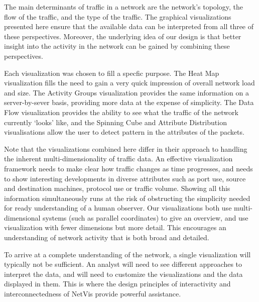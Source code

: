 The main determinants of traffic in a network are the network's topology, the flow of the traffic, and the type of the traffic. The graphical visualizations presented here ensure that the available data can be interpreted from all three of these perspectives. Moreover, the underlying idea of our design is that better insight into the activity in the network can be gained by combining these perspectives.

Each visualization was chosen to fill a specfic purpose.  The Heat Map visualization fills the need to gain a very quick impression of overall network load and size.  The Activity Groups visualization provides the same information on a server-by-sever basis, providing more data at the expense of simplicity.  The Data Flow visualization provides the ability to see what the traffic of the network currently `looks' like, and the Spinning Cube and Attribute Distribution visualisations allow the user to detect pattern in the attributes of the packets.

Note that the visualizations combined here differ in their approach to handling the inherent multi-dimensionality of traffic data. An effective visualization framework needs to make clear how traffic changes as time progresses, and needs to show interesting developments in diverse attributes such as port use, source and destination machines, protocol use or traffic volume. Showing all this information simultaneously runs at the risk of obstructing the simplicity needed for ready understanding of a human observer. Our visualizations both use multi-dimensional systems (such as parallel coordinates) to give an overview, and use visualization with fewer dimensions but more detail. This encourages an understanding of network activity that is both broad and detailed.

To arrive at a complete understanding of the network, a single visualization will typically not be sufficient. An analyst will need to see different approaches to interpret the data, and will need to customize the visualizations and the data displayed in them. This is where the design principles of interactivity and interconnectedness of NetVis provide powerful assistance.